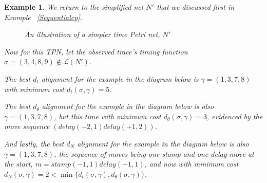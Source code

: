 \documentclass[conference]{IEEEtran}
\newtheorem{example}{Example}
\begin{document}
	\begin{example}\label{stamptoy}
We return to the simplified net $N'$ that we discussed first in Example ~\ref{Sequentialcp}. 
\begin{figure}[h]
	\centering
			\caption{An illustration of a simpler time Petri net, $N'$}
			\end{figure}

		Now for this TPN, let the observed trace's timing function ${\sigma = (3, 4, 8, 9) \not \in \mathcal{L}(N')}$. 
		
		The best $d_t$ alignment for the example in the diagram below is $\gamma = (1,3,7, 8)$ with minimum cost $d_t(\sigma, \gamma) = 5$. 
		
		The best $d_\theta$ alignment for the example in the diagram
                below is also $\gamma = (1,3,7, 8)$, but this time with minimum
                cost $d_\theta(\sigma, \gamma) = 3$, evidenced by the move
                sequence $(delay(-2, 1)delay(+1, 2))$.
		
		And lastly, the best $d_N$ alignment for the example in the diagram below is also $\gamma = (1,3,7,8)$, the sequence of moves being one stamp and one delay move at the start, $m = stamp(-1, 1)delay(-1, 1)$, and now with minimum cost $d_N(\sigma, \gamma) = 2 < \min \{d_t(\sigma, \gamma), d_\theta(\sigma, \gamma)\}$. 
	\end{example}
\end{document}
